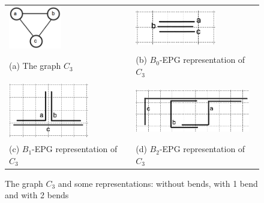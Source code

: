 \begin{figure}[h]
  \centering
  \begin{tabular}{ p{6cm} p{6cm} }
    \centering \includegraphics[width=2.3cm]{./img/trianguloabc.png} & \includegraphics[width=3.5cm]{./img/b0epgTransparenciaGrade2.png}
    \\
    \footnotesize \centering (a) The  graph $C_3$ & \footnotesize(b) $B_0$-EPG representation of $C_3$  \\
&  \\ \centering
\includegraphics[width=3.5cm]{./img/b1EpgTransparenteGrade2.png} %
     & 
  \includegraphics[width=5cm]{./img/b2epgTransparenciaGrade2.png}\\
  \footnotesize \centering (c) $B_1$-EPG representation of $C_3$  &  \footnotesize  (d) $B_2$-EPG representation of $C_3$ \\
  \end{tabular}

 \caption{The  graph $ C_3 $  and some representations: without bends, with 1 bend and with 2 bends} \label{fig:trianguloepgRepresentacao}
\end{figure}